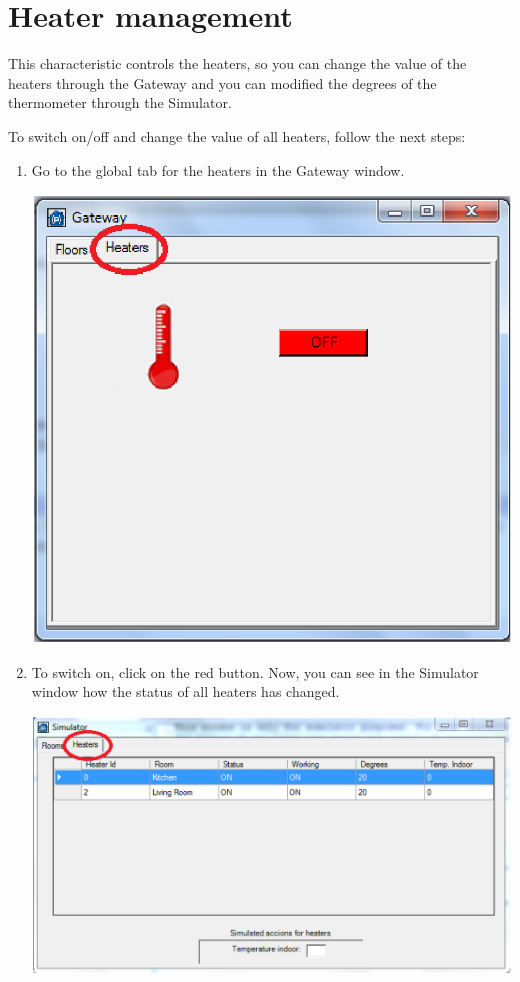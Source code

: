 \section{Heater management}
This characteristic controls the heaters, so you can change the value of the heaters through the Gateway and you can modified the degrees of the thermometer through the Simulator.

To switch on/off and change the value of all heaters, follow the next steps:
\begin{enumerate}
\item Go to the global tab for the heaters in the Gateway window.
\begin{center}
	\includegraphics[width=.68\linewidth]{images/globalHeater.eps}
	\\
\vspace{1cm}
\end{center}
\item To switch on, click on the red button. Now, you can see in the Simulator window how the status of all heaters has changed.
\begin{center}
	\includegraphics[width=.75\linewidth]{images/simulatorHeater.eps}
	\\
\vspace{1cm}

\end{center}
\end{enumerate}

